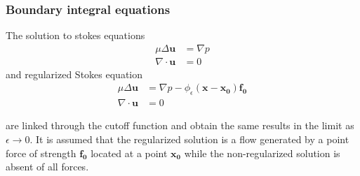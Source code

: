 \subsubsection{Boundary integral equations}

The solution to stokes equations
\begin{equation}
    \label{eq:BIE1}
\begin{aligned}
      \mu\Delta\boldsymbol{u} &= \nabla p \\
      \nabla \cdot \boldsymbol{u} &= 0
\end{aligned}
\end{equation}
and regularized Stokes equation
\begin{equation}
    \label{eq:BIE2}
\begin{aligned}
      \mu\Delta\boldsymbol{u} &= \nabla p - \phi_{\epsilon}(\mathbf{x}-\mathbf{x_0})\mathbf{f_0} \\
      \nabla \cdot \boldsymbol{u} &= 0
\end{aligned}
\end{equation}

are linked through the cutoff function and obtain the same results in the limit as $\epsilon \to 0$. It is assumed that the regularized solution is a flow generated by a point force of strength $\mathbf{f_0}$ located at a point $\mathbf{x_0}$ while the non-regularized solution is absent of all forces.

